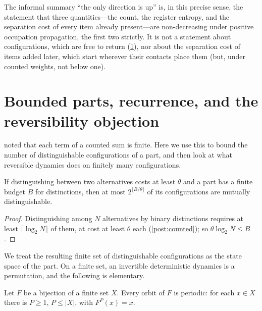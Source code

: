 \documentclass[10pt,twocolumn,a4paper]{article}
\begin{document}
The informal summary ``the only direction is up'' is, in this precise sense,
the statement that three quantities---the count, the register entropy, and
the separation cost of every item already present---are non-decreasing under
positive occupation propagation, the first two strictly. It is not a
statement about configurations, which are free to return (\cref{sec:bounded}),
nor about the separation cost of items added later, which start wherever
their contacts place them (but, under counted weights, not below one).

\section{Bounded parts, recurrence, and the reversibility objection}
\label{sec:bounded}

 noted that each term of a counted sum is finite.
Here we use this to bound the number of distinguishable configurations of a
part, and then look at what reversible dynamics does on finitely many
configurations.

\begin{proposition}
\label{prop:finite}
If distinguishing between two alternatives costs at least $\theta$ and a part
has a finite budget $B$ for distinctions, then at most
$2^{\lfloor B/\theta\rfloor}$ of its configurations are mutually
distinguishable.
\end{proposition}

\begin{proof}
Distinguishing among $N$ alternatives by binary distinctions requires at least
$\lceil\log_2N\rceil$ of them, at cost at least $\theta$ each
(\cref{post:counted}); so $\theta\log_2N\le B$.
\end{proof}

We treat the resulting finite set of distinguishable configurations as the
state space of the part. On a finite set, an invertible deterministic
dynamics is a permutation, and the following is elementary.

\begin{proposition}
\label{prop:recurrence}
Let $F$ be a bijection of a finite set $X$. Every orbit of $F$ is periodic:
for each $x\in X$ there is $P\ge1$, $P\le|X|$, with $F^P(x)=x$.
\end{proposition}
\end{document}
